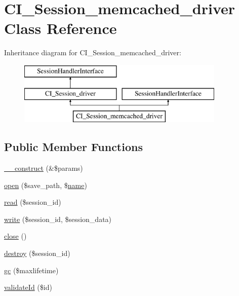 \hypertarget{class_c_i___session__memcached__driver}{}\section{C\+I\+\_\+\+Session\+\_\+memcached\+\_\+driver Class Reference}
\label{class_c_i___session__memcached__driver}
Inheritance diagram for C\+I\+\_\+\+Session\+\_\+memcached\+\_\+driver\+:\begin{figure}[H]
\begin{center}
\leavevmode
\includegraphics[height=3.000000cm]{class_c_i___session__memcached__driver}
\end{center}
\end{figure}
\subsection*{Public Member Functions}
\begin{DoxyCompactItemize}
\item 
\mbox{\hyperlink{class_c_i___session__memcached__driver_ac1669c73d53d6f16cf5459a1e84d39c8}{\+\_\+\+\_\+construct}} (\&\$params)
\item 
\mbox{\hyperlink{class_c_i___session__memcached__driver_a614b5cf3840833913c7a73260ed28e02}{open}} (\$save\+\_\+path, \$\mbox{\hyperlink{waiter_2order_8php_afb270cde4944e425a37cf277116a7f43}{name}})
\item 
\mbox{\hyperlink{class_c_i___session__memcached__driver_a5bbf84ebf657be4eaccc0582377c76bf}{read}} (\$session\+\_\+id)
\item 
\mbox{\hyperlink{class_c_i___session__memcached__driver_ad9d124885be93668f1dbf6aace5964f5}{write}} (\$session\+\_\+id, \$session\+\_\+data)
\item 
\mbox{\hyperlink{class_c_i___session__memcached__driver_aa69c8bf1f1dcf4e72552efff1fe3e87e}{close}} ()
\item 
\mbox{\hyperlink{class_c_i___session__memcached__driver_aaec5812f6b4eb6835f88d3baa06a002a}{destroy}} (\$session\+\_\+id)
\item 
\mbox{\hyperlink{class_c_i___session__memcached__driver_a57aff7ee0656d8aa75d545fb8b3ae35d}{gc}} (\$maxlifetime)
\item 
\mbox{\hyperlink{class_c_i___session__memcached__driver_a4a58e8f59b2accc199bbebd5ee52bc74}{validate\+Id}} (\$id)
\end{DoxyCompactItemize}
